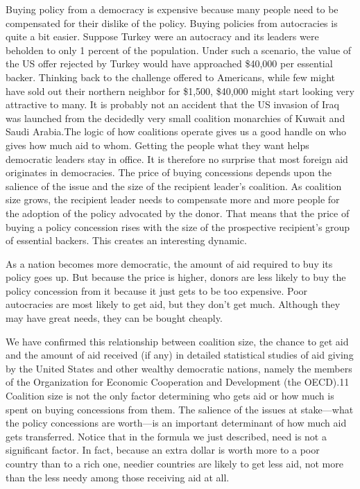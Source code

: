 \documentclass[10pt]{article}
\begin{document}
{\large Buying policy from a democracy is expensive because many people need to
be compensated for their dislike of the policy. Buying policies from autocracies
is quite a bit easier. Suppose Turkey were an autocracy and its leaders were
beholden to only 1 percent of the population. Under such a scenario, the value of
the US offer rejected by Turkey would have approached \$40,000 per essential
backer. Thinking back to the challenge offered to Americans, while few might have
sold out their northern neighbor for \$1,500, \$40,000 might start looking very
attractive to many. It is probably not an accident that the US invasion of Iraq
was launched from the decidedly very small coalition monarchies of Kuwait and
Saudi Arabia.The logic of how coalitions operate gives us a good handle on who
gives how much aid to whom. Getting the people what they want helps democratic
leaders stay in office. It is therefore no surprise that most foreign aid
originates in democracies. The price of buying concessions depends upon the
salience of the issue and the size of the recipient leader's coalition. As
coalition size grows, the recipient leader needs to compensate more and more
people for the adoption of the policy advocated by the donor. That means that the
price of buying a policy concession rises with the size of the prospective
recipient's group of essential backers. This creates an interesting dynamic.}

{\large As a nation becomes more democratic, the amount of aid required to buy
its policy goes up. But because the price is higher, donors are less likely to
buy the policy concession from it because it just gets to be too expensive. Poor
autocracies are most likely to get aid, but they don't get much. Although they
may have great needs, they can be bought cheaply.}

{\large We have confirmed this relationship between coalition size, the chance
to get aid and the amount of aid received (if any) in detailed statistical
studies of aid giving by the United States and other wealthy democratic nations,
namely the members of the Organization for Economic Cooperation and Development
(the OECD).11 Coalition size is not the only factor determining who gets aid or
how much is spent on buying concessions from them. The salience of the issues at
stake---what the policy concessions are worth---is an important determinant of
how much aid gets transferred. Notice that in the formula we just described, need
is not a significant factor. In fact, because an extra dollar is worth more to a
poor country than to a rich one, needier countries are likely to get less aid,
not more than the less needy among those receiving aid at all.}
\end{document}
